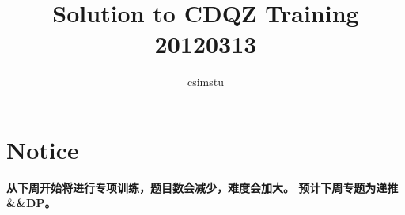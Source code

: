 \documentclass[a4paper]{article}
\begin{document}
\title{Solution to CDQZ Training 20120313}
\author{csimstu}
\maketitle
\tableofcontents












\section{Notice}
\textbf{\large 从下周开始将进行专项训练，题目数会减少，难度会加大。
预计下周专题为递推\&\&DP。}
\end{document}
